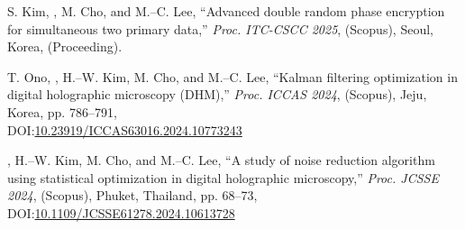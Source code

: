 \documentclass[a4paper,9pt]{extarticle}
\begin{document}
\begin{enumerate}[label={[\arabic*]}, start=1]
    \item 
    S. Kim, , M. Cho, and M.--C. Lee, 
    ``Advanced double random phase encryption for simultaneous two primary data,'' 
    \textit{Proc. ITC-CSCC 2025}, (Scopus),
    Seoul, Korea,
    (Proceeding).
    
    \item 
    T. Ono, , H.--W. Kim, M. Cho, and M.--C. Lee, 
    ``Kalman filtering optimization in digital holographic microscopy (DHM),'' 
    \textit{Proc. ICCAS 2024}, (Scopus),
    Jeju, Korea, pp. 786--791, \\
    DOI:\href{https://doi.org/10.23919/ICCAS63016.2024.10773243}{10.23919/ICCAS63016.2024.10773243} 
    

    \item 
    , H.--W. Kim, M. Cho, and M.--C. Lee, 
    ``A study of noise reduction algorithm using statistical optimization in digital holographic microscopy,'' 
    \textit{Proc. JCSSE 2024}, (Scopus),
    Phuket, Thailand, pp. 68--73, \\
    DOI:\href{https://doi.org/10.1109/JCSSE61278.2024.10613728}{10.1109/JCSSE61278.2024.10613728} \\
    
    
\end{enumerate} 
\end{document}
